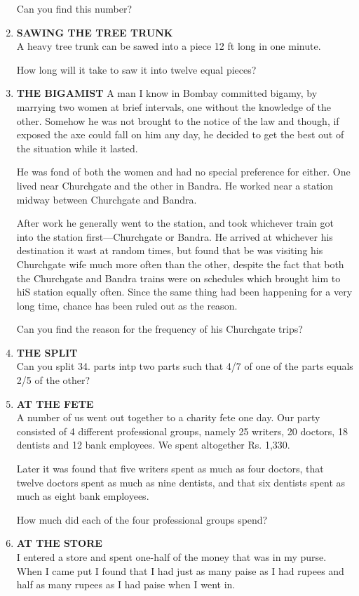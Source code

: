 \documentclass[12pt]{article}
\begin{document}
\begin{enumerate}
Can you  find  this number? 
%
\item \textbf{SAWING  THE  TREE  TRUNK} \\
A heavy  tree  trunk  can  be sawed  into  a piece  12 ft long in one minute.

How  long  will it take  to saw it into  twelve equal  pieces? 
%
\item \textbf{THE  BIGAMIST} 
A man  I know  in Bombay  committed  bigamy,  by marrying two women  at brief  intervals,  one without  the knowledge of the  other.  Somehow  he was  not  brought  to the notice  of the law and  though,  if exposed  the axe could fall on him  any day,  he decided  to get the best  out of the situation  while  it lasted. 

He was  fond  of both  the  women  and had no special preference  for either.  One  lived  near  Churchgate  and the other  in Bandra.  He  worked  near  a station  midway between  Churchgate  and Bandra. 

After  work  he generally  went  to the station,  and took whichever  train  got into  the station  first—Churchgate  or Bandra.  He  arrived  at whichever  his destination  it wast at random  times,  but  found  that  be was  visiting  his Churchgate  wife  much  more  often  than  the other,  despite the fact  that both  the Churchgate  and  Bandra  trains  were on schedules  which  brought  him  to hiS  station  equally often.  Since  the same  thing  had  been  happening  for a very long  time,  chance  has  been  ruled  out  as the reason. 

Can you  find  the  reason  for  the  frequency  of his Churchgate  trips? 
%
\item \textbf{THE  SPLIT} \\
Can you split  34. parts  intp  two parts  such  that 4/7 of one 
of the parts  equals 2/5 of  the other? 
%
\item \textbf{AT  THE  FETE} \\
A number  of us went  out together  to a charity  fete  one day. Our  party  consisted  of 4 different  professional groups,  namely  25 writers,  20 doctors,  18 dentists  and  12 bank  employees.  We  spent  altogether  Rs. 1,330. 

Later  it was  found  that  five writers  spent  as much  as four doctors,  that twelve  doctors  spent  as much  as nine dentists,  and  that  six dentists  spent  as much  as eight  bank employees. 

How  much  did  each  of the four  professional  groups spend? 
%
\item \textbf{AT THE  STORE} \\
I entered  a store  and spent  one-half  of the money  that  was in my  purse.  When  I came  put I found  that  I had  just as many  paise  as I had rupees  and half  as many  rupees  as I had paise  when  I went  in. 


\end{enumerate}
\end{document}
